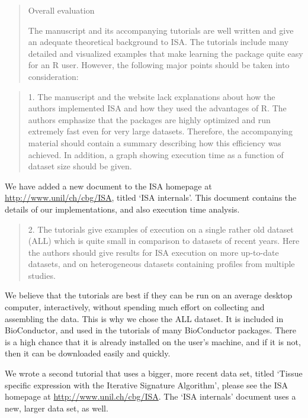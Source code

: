 \documentclass[a4paper]{article}
\begin{document}
\begin{quote}
Overall evaluation

The manuscript and its accompanying tutorials are well written and
give an adequate theoretical background to ISA. The tutorials include
many detailed and visualized examples that make learning the package
quite easy for an R user. However, the following major points should
be taken into consideration: 
\end{quote}

\begin{quote}
1.      The manuscript and the website lack explanations about how the
authors implemented ISA and how they used the advantages of R. The
authors emphasize that the packages are highly optimized and run
extremely fast even for very large datasets.  Therefore, the
accompanying material should contain a summary describing how this
efficiency was achieved. In addition, a graph showing execution time
as a function of dataset size should be given. 
\end{quote}

We have added a new document to the ISA homepage at
\url{http://www.unil/ch/cbg/ISA}, titled `ISA internals'. This
document contains the details of our implementations, and also
execution time analysis.

\begin{quote}
2.      The tutorials give examples of execution on a single rather
old dataset (ALL) which is quite small in comparison to datasets of
recent years. Here the authors should give results for ISA execution
on more up-to-date datasets, and on heterogeneous datasets containing
profiles from multiple studies. 
\end{quote}

We believe that the tutorials are best if they can be run on an
average desktop computer, interactively, without spending much
effort on collecting and assembling the data. This is why we chose the
ALL dataset. It is included in BioConductor, and used in the tutorials
of many BioConductor packages. There is a high chance that it is
already installed on the user's machine, and if it is not, then it can
be downloaded easily and quickly.

We wrote a second tutorial that uses a bigger, more recent data set, 
titled `Tissue specific expression with the Iterative Signature
Algorithm', please see the ISA homepage at
\url{http://www.unil.ch/cbg/ISA}. The `ISA internals' document uses a
new, larger data set, as well.
\end{document}
